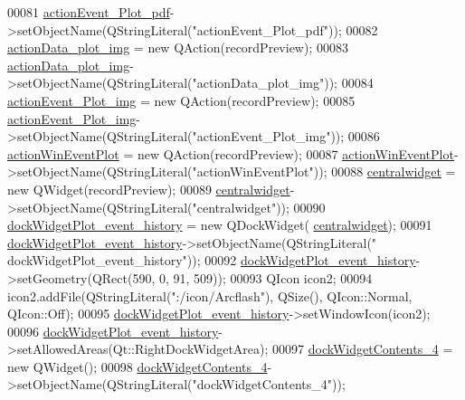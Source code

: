 \begin{DoxyCode}
00081         \hyperlink{a00081_a4369770edbf9cb6131a066ca10b3f863}{actionEvent\_Plot\_pdf}->setObjectName(QStringLiteral(\textcolor{stringliteral}{"actionEvent\_Plot\_pdf"}));
00082         \hyperlink{a00081_ae841c150cf6131bef2e8d12da0401ce2}{actionData\_plot\_img} = \textcolor{keyword}{new} QAction(recordPreview);
00083         \hyperlink{a00081_ae841c150cf6131bef2e8d12da0401ce2}{actionData\_plot\_img}->setObjectName(QStringLiteral(\textcolor{stringliteral}{"actionData\_plot\_img"}));
00084         \hyperlink{a00081_a789f5466c7f1781c13d4d027e982ca55}{actionEvent\_Plot\_img} = \textcolor{keyword}{new} QAction(recordPreview);
00085         \hyperlink{a00081_a789f5466c7f1781c13d4d027e982ca55}{actionEvent\_Plot\_img}->setObjectName(QStringLiteral(\textcolor{stringliteral}{"actionEvent\_Plot\_img"}));
00086         \hyperlink{a00081_ac72ec9c8679d46fd43a87f99ee6db893}{actionWinEventPlot} = \textcolor{keyword}{new} QAction(recordPreview);
00087         \hyperlink{a00081_ac72ec9c8679d46fd43a87f99ee6db893}{actionWinEventPlot}->setObjectName(QStringLiteral(\textcolor{stringliteral}{"actionWinEventPlot"}));
00088         \hyperlink{a00081_ac9ab4609922159e8e4cc45905f76928e}{centralwidget} = \textcolor{keyword}{new} QWidget(recordPreview);
00089         \hyperlink{a00081_ac9ab4609922159e8e4cc45905f76928e}{centralwidget}->setObjectName(QStringLiteral(\textcolor{stringliteral}{"centralwidget"}));
00090         \hyperlink{a00081_a2a8f7ee8d4458dd20481c8a1c29ce185}{dockWidgetPlot\_event\_history} = \textcolor{keyword}{new} QDockWidget(
      \hyperlink{a00081_ac9ab4609922159e8e4cc45905f76928e}{centralwidget});
00091         \hyperlink{a00081_a2a8f7ee8d4458dd20481c8a1c29ce185}{dockWidgetPlot\_event\_history}->setObjectName(QStringLiteral(\textcolor{stringliteral}{"
      dockWidgetPlot\_event\_history"}));
00092         \hyperlink{a00081_a2a8f7ee8d4458dd20481c8a1c29ce185}{dockWidgetPlot\_event\_history}->setGeometry(QRect(590, 0, 91, 509));
00093         QIcon icon2;
00094         icon2.addFile(QStringLiteral(\textcolor{stringliteral}{":/icon/Arcflash"}), QSize(), QIcon::Normal, QIcon::Off);
00095         \hyperlink{a00081_a2a8f7ee8d4458dd20481c8a1c29ce185}{dockWidgetPlot\_event\_history}->setWindowIcon(icon2);
00096         \hyperlink{a00081_a2a8f7ee8d4458dd20481c8a1c29ce185}{dockWidgetPlot\_event\_history}->setAllowedAreas(Qt::RightDockWidgetArea);
00097         \hyperlink{a00081_a538c2b98d6f228a073dea0a3ddb4350e}{dockWidgetContents\_4} = \textcolor{keyword}{new} QWidget();
00098         \hyperlink{a00081_a538c2b98d6f228a073dea0a3ddb4350e}{dockWidgetContents\_4}->setObjectName(QStringLiteral(\textcolor{stringliteral}{"dockWidgetContents\_4"}));

\end{DoxyCode}
